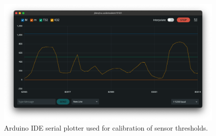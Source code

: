 \begin{figure}
    \centering
    \includegraphics[width=\linewidth]{src/images/serial_monitor.png}
    \caption{Arduino IDE serial plotter used for calibration of sensor thresholds.}
    \label{fig:serial_monitor}
\end{figure}








